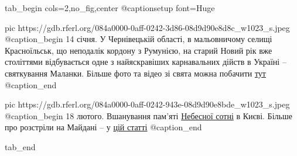  
 
 
 
 

\ifcmt
  tab_begin cols=2,no_fig,center
     @captionsetup font=Huge

     pic https://gdb.rferl.org/084a0000-0aff-0242-3d86-08d9d90e8d8c_w1023_s.jpeg
     @caption_begin
14 січня. У Чернівецькій області, в мальовничому селищі Красноїльськ, що
неподалік кордону з Румунією, на старий Новий рік вже століттями
відбувається одне з найяскравіших карнавальних дійств в Україні –
святкування Маланки. Більше фото та відео зі свята можна побачити 
\href{https://www.radiosvoboda.org/a/31048285.html}{тут} 
     @caption_end

     pic https://gdb.rferl.org/084a0000-0aff-0242-943e-08d9d90e8bde_w1023_s.jpeg
     @caption_begin
18 лютого. Вшанування пам'яті
\href{https://www.radiosvoboda.org/a/photo-nebesna-sotnya-vshanuvannya-kyiv/31109687.html}{Небесної
сотні} в Києві. Більше про розстріли на Майдані – у \href{https://www.radiosvoboda.org/a/dbr-i-henprokuror-pro-zavershennya-rozsliduvannya-rozstriliv-na-maydani/31564810.html}{цій статті}
     @caption_end

  tab_end
\fi
